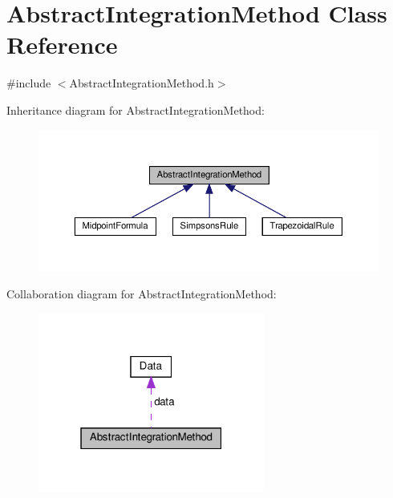 \hypertarget{classAbstractIntegrationMethod}{}\section{Abstract\+Integration\+Method Class Reference}
\label{classAbstractIntegrationMethod}


{\ttfamily \#include $<$Abstract\+Integration\+Method.\+h$>$}



Inheritance diagram for Abstract\+Integration\+Method\+:\nopagebreak
\begin{figure}[H]
\begin{center}
\leavevmode
\includegraphics[width=350pt]{classAbstractIntegrationMethod__inherit__graph}
\end{center}
\end{figure}


Collaboration diagram for Abstract\+Integration\+Method\+:\nopagebreak
\begin{figure}[H]
\begin{center}
\leavevmode
\includegraphics[width=211pt]{classAbstractIntegrationMethod__coll__graph}
\end{center}
\end{figure}
